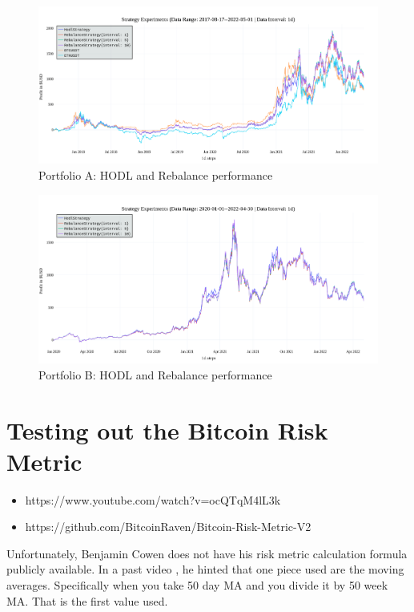 \begin{figure}[ht]
    \centering
    \includegraphics[width=\columnwidth]{figures/benchmark-A.png}
    \caption{Portfolio A: HODL and Rebalance performance}
    \label{figure-benchmark-1}
\end{figure}

\begin{figure}[ht]
    \centering
    \includegraphics[width=\columnwidth]{figures/benchmark-B.png}
    \caption{Portfolio B: HODL and Rebalance performance}
    \label{figure-benchmark-2}
\end{figure}

\section{Testing out the Bitcoin Risk Metric}
\begin{itemize}
    \item https://www.youtube.com/watch?v=ocQTqM4lL3k
    \item https://github.com/BitcoinRaven/Bitcoin-Risk-Metric-V2
\end{itemize}

Unfortunately, Benjamin Cowen does not have his risk metric calculation formula publicly available. In a past video \cite{youtube:cowen-moving-average}, he hinted that one piece used are the moving averages. Specifically when you take 50 day MA and you divide it by 50 week MA. That is the first value used.

